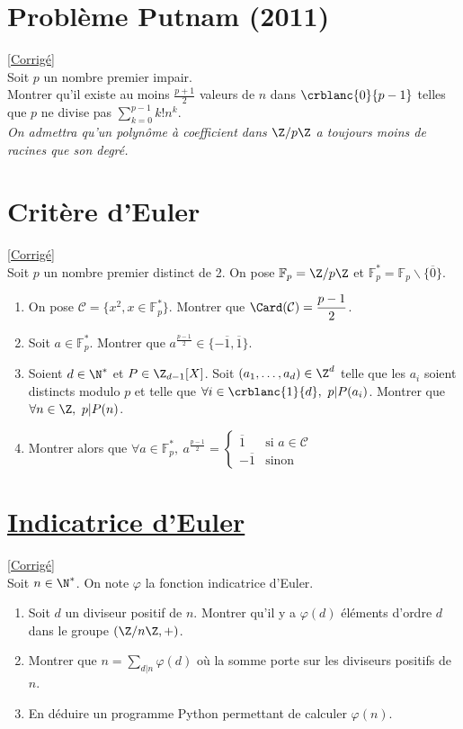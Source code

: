 \documentclass[8pt]{book}
\begin{document}
\section{Problème Putnam (2011) }
\label{Problème Putnam}
\textcolor{blue}{\hyperref[Problème Putnam corrigé]{[Corrigé]}}\\
Soit $p$ un nombre premier impair.\\
Montrer qu'il existe au moins $\displaystyle\frac{p+1}{2}$ valeurs de $n$ dans $\crblanc{0}{p-1}$ telles que $p$ ne divise pas $\displaystyle\sum_{k=0}^{p-1}k!n^k$.\\
\textit{On admettra qu'un polynôme à coefficient dans $\Z/p\Z$ a toujours moins de racines que son degré.}

\section{Critère d'Euler }
\label{Critère d'Euler}
\textcolor{blue}{\hyperref[Critère d'Euler corrigé]{[Corrigé]}}\\
Soit $p$ un nombre premier distinct de 2. On pose $\mathbb{F}_p=\Z/p\Z$ et $\mathbb F_p^*=\mathbb F_p\backslash \{\overline{0}\}$.
\begin{enumerate}[leftmargin=*]
	\item On pose $\mathcal C=\{x^2,x\in \mathbb F_p^*\}$. Montrer que $\Card(\mathcal C)=\displaystyle\frac{p-1}{2}$.
	\item Soit $a\in\mathbb F_p^*$. Montrer que $a^{\frac{p-1}{2}}\in \{-\overline 1,\overline 1\}$.
	\item Soient $d\in \N^*$ et $P\in \Z_{d-1}[X]$. Soit $(a_1,\dots,a_d)\in \Z^d$ telle que les $a_i$ soient distincts modulo $p$ et telle que $\forall i\in \crblanc{1}{d},\ p|P(a_i)$. Montrer que $\forall n\in \Z,\ p|P(n)$.
	\item Montrer alors que $\forall a\in \mathbb F_p^*,\ a^{\frac{p-1}{2}}=
	\begin{cases}
		\overline 1 & \mbox{si } a\in \mathcal C\\
		-\overline 1 & \mbox{sinon}
	\end{cases}$
\end{enumerate}

\section{\underline{Indicatrice d'Euler} }
\label{Indicatrice d'Euler}
\textcolor{blue}{\hyperref[Indicatrice d'Euler corrigé]{[Corrigé]}}\\
Soit $n\in \N^*$. On note $\varphi$ la fonction indicatrice d'Euler.
\begin{enumerate}[leftmargin=*]
	\item Soit $d$ un diviseur positif de $n$. Montrer qu'il y a $\varphi(d)$ éléments d'ordre $d$ dans le groupe $(\Z/n\Z,+)$.
	\item Montrer que $n=\displaystyle\sum\limits_{d|n}{\varphi(d)}$ où la somme porte sur les diviseurs positifs de $n$.
	\item En déduire un programme Python permettant de calculer $\varphi(n)$.
\end{enumerate}
\end{document}
